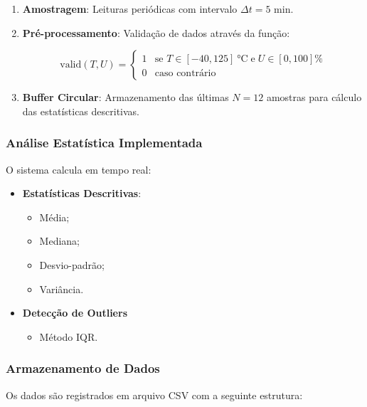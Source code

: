 \documentclass[12pt, a4paper]{article}
\begin{document}
\begin{enumerate}
    \item \textbf{Amostragem}: Leituras periódicas com intervalo $\Delta t = 5$ min.
    \item \textbf{Pré-processamento}: Validação de dados através da função:

        \begin{equation}
            \text{valid}(T,U) = 
            \begin{cases}
                1 & \text{se } T \in [-40,125] \SI{}{\celsius} \; \text{e} \; U \in [0,100]\% \\
                0 & \text{caso contrário}
            \end{cases}
        \end{equation}

    \item \textbf{Buffer Circular}: Armazenamento das últimas $N=12$ amostras para cálculo das estatísticas descritivas.
\end{enumerate}

\subsubsection{Análise Estatística Implementada}
O sistema calcula em tempo real:

\begin{itemize}
    \item \textbf{Estatísticas Descritivas}:
        \begin{itemize}
            \item Média;
            \item Mediana;
            \item Desvio-padrão;
            \item Variância.
        \end{itemize}

    \item \textbf{Detecção de Outliers}
        \begin{itemize}
            \item Método IQR.
        \end{itemize} 

\end{itemize}

\subsubsection{Armazenamento de Dados}
Os dados são registrados em arquivo CSV com a seguinte estrutura:
\end{document}
